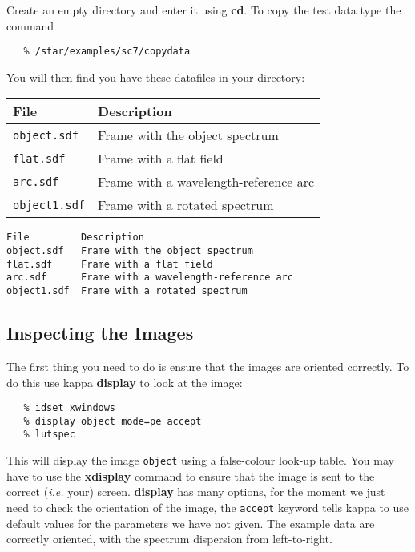 \documentclass[twoside,11pt]{article}
\newenvironment{latexonly}{}{}
\newcommand{\xref}[3]{#1}
\newcommand{\xlabel}[1]{}
\newcommand{\mlabel}[1]{\xlabel{#1}\label{#1}}
\newcommand{\scspec}[2]{#1}
\newcommand{\scspec}[2]{#2}
\begin{document}
Create an empty directory and enter it using {\bf cd}\@.
To copy the test data type the command

{
\scspec{\small}{ }
\begin{verbatim}
   % /star/examples/sc7/copydata
\end{verbatim}
}

You will then find you have these datafiles in your directory:

\begin{latexonly}
\begin{center}
\begin{tabular}{ll}
File & Description \\ \hline
{\tt object.sdf}  & Frame with the object spectrum\\
{\tt flat.sdf}    & Frame with a flat field\\
{\tt arc.sdf}     & Frame with a wavelength-reference arc\\
{\tt object1.sdf} & Frame with a rotated spectrum\\ \hline
\end{tabular}
\end{center}
\end{latexonly}
\begin{htmlonly}
\begin{verbatim}
File         Description
object.sdf   Frame with the object spectrum
flat.sdf     Frame with a flat field
arc.sdf      Frame with a wavelength-reference arc
object1.sdf  Frame with a rotated spectrum
\end{verbatim}
\end{htmlonly}

\subsection{\mlabel{inspecting_the_images}Inspecting the Images}

The first thing you need to do is ensure that the images are oriented
correctly.  To do this use \xref{{\sc kappa}}{sun95}{}
\xref{{\bf display}}{sun95}{DISPLAY} to look at the image:

{
\scspec{\small}{ }
\begin{verbatim}
   % idset xwindows
   % display object mode=pe accept
   % lutspec
\end{verbatim}
}

This will display the image \verb+object+ using a false-colour
look-up table.  You may have to use the
\xref{{\bf xdisplay}}{sun129}{}\cite{xdisplay} command to ensure
that the image is sent to the correct ({\it{i.e.}} your) screen.
{\bf display} has many
options, for the moment we just need to check the orientation of the image,
the \verb+accept+ keyword tells {\sc kappa} to use default values for the
parameters we have not given.
The example data are correctly oriented, with the spectrum dispersion
from left-to-right.
\end{document}
